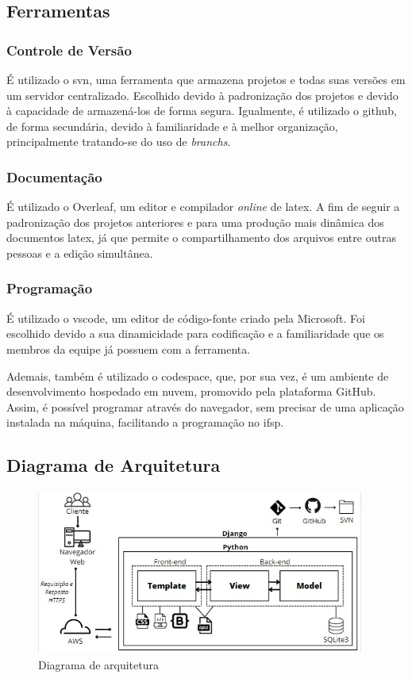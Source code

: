 \subsection{Ferramentas}

\subsubsection{Controle de Versão}
É utilizado o \ac{svn}, uma ferramenta que armazena projetos e todas suas versões em um servidor centralizado. Escolhido devido à padronização dos projetos e devido à capacidade de armazená-los de forma segura. Igualmente, é utilizado o \gls{github}, de forma secundária, devido à familiaridade e à melhor organização, principalmente tratando-se do uso de \textit{branchs}.

\subsubsection{Documentação}
É utilizado o Overleaf, um editor e compilador \textit{online} de \gls{latex}. A fim de seguir a padronização dos projetos anteriores e para uma produção mais dinâmica dos documentos \gls{latex}, já que permite o compartilhamento dos arquivos entre outras pessoas e a edição simultânea. 

\subsubsection{Programação}
É utilizado o \ac{vscode}, um editor de código-fonte criado pela Microsoft. Foi escolhido devido a sua dinamicidade para codificação e a familiaridade que os membros da equipe já possuem com a ferramenta. 

Ademais, também é utilizado o codespace, que, por sua vez, é um ambiente de desenvolvimento hospedado em nuvem, promovido pela plataforma GitHub. Assim, é possível programar através do navegador, sem precisar de uma aplicação instalada na máquina, facilitando a programação no \ac{ifsp}. 

\subsection{Diagrama de Arquitetura}

\begin{figure}[h]
    \centering
    \includegraphics[width=0.96\textwidth]{anexos/DiagramaDeArquitetura/DiagramaDeArquitetura.jpeg}
    \caption{Diagrama de arquitetura}
    \label{fig:figura1} 
\end{figure}

